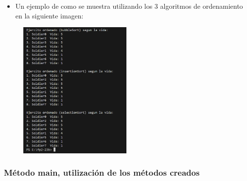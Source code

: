 \documentclass{article}
\begin{document}
        \begin{itemize}
            \begin{itemize}
                \item Un ejemplo de como se muestra utilizando los 3 algoritmos de ordenamiento en la siguiente imagen:
            \end{itemize}
        \end{itemize}

        \begin{figure}[H]
            \centering
            \includegraphics[width=0.5\textwidth,keepaspectratio]{img/printArmyHealth.png}
            \caption{}
        \end{figure}
        
        
        \subsubsection{Método main, utilización de los métodos creados}
        
\end{document}
